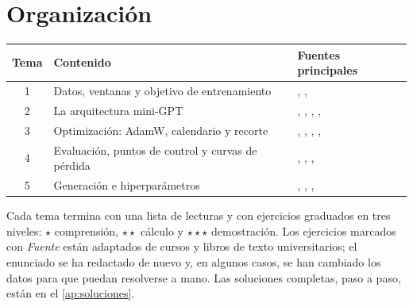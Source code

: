 \documentclass[11pt,a4paper,twoside,openany]{book}
\begin{document}
\section*{Organización}
\begin{center}\small
\begin{tabular}{@{}cll@{}}
\toprule
Tema & Contenido & Fuentes principales \\
\midrule
1 & Datos, ventanas y objetivo de entrenamiento & \cite{cs336}, \cite{d2l}, \cite{cs224n} \\
2 & La arquitectura mini-GPT & \cite{gpt2}, \cite{vaswani}, \cite{cs336}, \cite{d2l}, \cite{llama} \\
3 & Optimización: AdamW, calendario y recorte & \cite{cs336}, \cite{adamw}, \cite{sgdr}, \cite{llama}, \cite{gbc} \\
4 & Evaluación, puntos de control y curvas de pérdida & \cite{gbc}, \cite{cs336}, \cite{ct}, \cite{llama3} \\
5 & Generación e hiperparámetros & \cite{cs336}, \cite{fan}, \cite{holtzman}, \cite{gbc} \\
\bottomrule
\end{tabular}
\end{center}

Cada tema termina con una lista de lecturas y con ejercicios graduados en tres niveles: $\star$ comprensión, $\star\star$ cálculo y $\star\star\star$ demostración. Los ejercicios marcados con \emph{Fuente} están adaptados de cursos y libros de texto universitarios; el enunciado se ha redactado de nuevo y, en algunos casos, se han cambiado los datos para que puedan resolverse a mano. Las soluciones completas, paso a paso, están en el \cref{ap:soluciones}.
\end{document}
